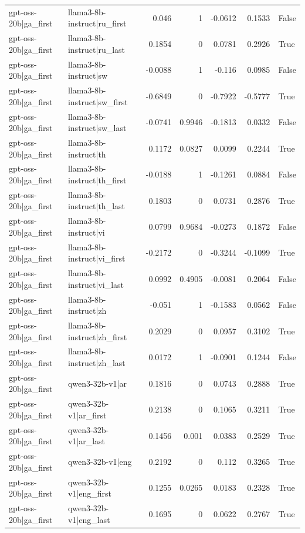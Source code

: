\begin{table}
\begin{tabular}{l l r r r r l}
gpt-oss-20b|ga_first & llama3-8b-instruct|ru_first & 0.046 & 1 & -0.0612 & 0.1533 & False \\
gpt-oss-20b|ga_first & llama3-8b-instruct|ru_last & 0.1854 & 0 & 0.0781 & 0.2926 & True \\
gpt-oss-20b|ga_first & llama3-8b-instruct|sw & -0.0088 & 1 & -0.116 & 0.0985 & False \\
gpt-oss-20b|ga_first & llama3-8b-instruct|sw_first & -0.6849 & 0 & -0.7922 & -0.5777 & True \\
gpt-oss-20b|ga_first & llama3-8b-instruct|sw_last & -0.0741 & 0.9946 & -0.1813 & 0.0332 & False \\
gpt-oss-20b|ga_first & llama3-8b-instruct|th & 0.1172 & 0.0827 & 0.0099 & 0.2244 & True \\
gpt-oss-20b|ga_first & llama3-8b-instruct|th_first & -0.0188 & 1 & -0.1261 & 0.0884 & False \\
gpt-oss-20b|ga_first & llama3-8b-instruct|th_last & 0.1803 & 0 & 0.0731 & 0.2876 & True \\
gpt-oss-20b|ga_first & llama3-8b-instruct|vi & 0.0799 & 0.9684 & -0.0273 & 0.1872 & False \\
gpt-oss-20b|ga_first & llama3-8b-instruct|vi_first & -0.2172 & 0 & -0.3244 & -0.1099 & True \\
gpt-oss-20b|ga_first & llama3-8b-instruct|vi_last & 0.0992 & 0.4905 & -0.0081 & 0.2064 & False \\
gpt-oss-20b|ga_first & llama3-8b-instruct|zh & -0.051 & 1 & -0.1583 & 0.0562 & False \\
gpt-oss-20b|ga_first & llama3-8b-instruct|zh_first & 0.2029 & 0 & 0.0957 & 0.3102 & True \\
gpt-oss-20b|ga_first & llama3-8b-instruct|zh_last & 0.0172 & 1 & -0.0901 & 0.1244 & False \\
gpt-oss-20b|ga_first & qwen3-32b-v1|ar & 0.1816 & 0 & 0.0743 & 0.2888 & True \\
gpt-oss-20b|ga_first & qwen3-32b-v1|ar_first & 0.2138 & 0 & 0.1065 & 0.3211 & True \\
gpt-oss-20b|ga_first & qwen3-32b-v1|ar_last & 0.1456 & 0.001 & 0.0383 & 0.2529 & True \\
gpt-oss-20b|ga_first & qwen3-32b-v1|eng & 0.2192 & 0 & 0.112 & 0.3265 & True \\
gpt-oss-20b|ga_first & qwen3-32b-v1|eng_first & 0.1255 & 0.0265 & 0.0183 & 0.2328 & True \\
gpt-oss-20b|ga_first & qwen3-32b-v1|eng_last & 0.1695 & 0 & 0.0622 & 0.2767 & True \\

\end{tabular}
\end{table}
